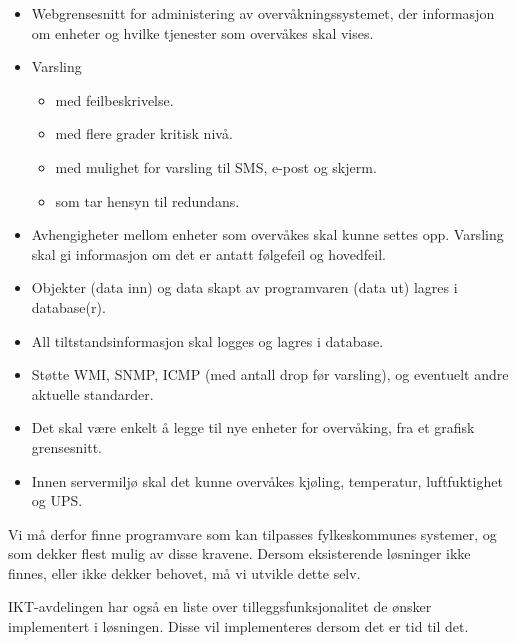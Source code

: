 \begin{itemize}
	\item Webgrensesnitt for administering av overvåkningssystemet, der informasjon om enheter og hvilke tjenester som overvåkes skal vises.
	\item Varsling
	\begin{itemize} 
		\item med feilbeskrivelse.
		\item med flere grader kritisk nivå.
		\item med mulighet for varsling til SMS, e-post og skjerm.
		\item som tar hensyn til redundans.
	\end{itemize}
	\item Avhengigheter mellom enheter som overvåkes skal kunne settes opp. Varsling skal gi informasjon om det er antatt følgefeil og hovedfeil.
	\item Objekter (data inn) og data skapt av programvaren (data ut) lagres i database(r).
	\item All tiltstandsinformasjon skal logges og lagres i database.
	\item Støtte WMI, SNMP, ICMP (med antall drop før varsling), og eventuelt andre aktuelle standarder.
	\item Det skal være enkelt å legge til nye enheter for overvåking, fra et grafisk grensesnitt.
	\item Innen servermiljø skal det kunne overvåkes kjøling, temperatur, luftfuktighet og UPS.
\end{itemize}

Vi må derfor finne programvare som kan tilpasses fylkeskommunes systemer, og som dekker flest mulig av disse kravene. Dersom eksisterende løsninger ikke finnes, eller ikke dekker behovet, må vi utvikle dette selv.

IKT-avdelingen har også en liste over tilleggsfunksjonalitet de ønsker implementert i løsningen. Disse vil implementeres dersom det er tid til det.

